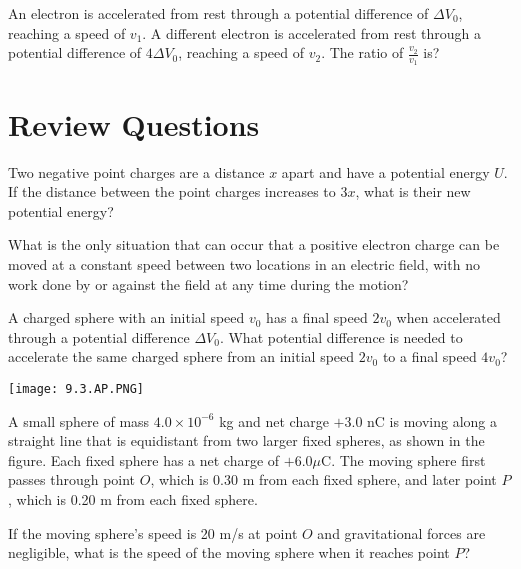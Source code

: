 \documentclass[../em.tex]{subfiles}
\begin{document}
\ex An electron is accelerated from rest through a potential difference of $\Delta V_0$, reaching a speed of $v_1$. A different electron is accelerated from rest through a potential difference of $4\Delta V_0$, reaching a speed of $v_2$. The ratio of $\frac{v_2}{v_1}$ is?

\section*{Review Questions}
\ex Two negative point charges are a distance $x$ apart and have a potential energy $U$. If the distance between the point charges increases to $3x$, what is their new potential energy?

\ex What is the only situation that can occur that a positive electron charge can be moved at a constant speed between two locations in an electric field, with no work done by or against the field at any time during the motion?

\ex A charged sphere with an initial speed $v_0$ has a final speed $2v_0$ when accelerated through a potential difference $\Delta V_0$. What potential difference is needed to accelerate the same charged sphere from an initial speed $2v_0$ to a final speed $4v_0$?

\pagebreak
\ex \begin{center}
    \texttt{[image: 9.3.AP.PNG]}
\end{center}
A small sphere of mass $4.0\times 10^{-6}$ kg and net charge $+3.0$ nC is moving along a straight line that is equidistant from two larger fixed spheres, as shown in the figure. Each fixed sphere has a net charge of $+6.0\mu$C. The moving sphere first passes through point $O$, which is $0.30$ m from each fixed sphere, and later point $P$, which is 0.20 m from each fixed sphere.

If the moving sphere's speed is 20 m/s at point $O$ and gravitational forces are negligible, what is the speed of the moving sphere when it reaches point $P$?
\end{document}
